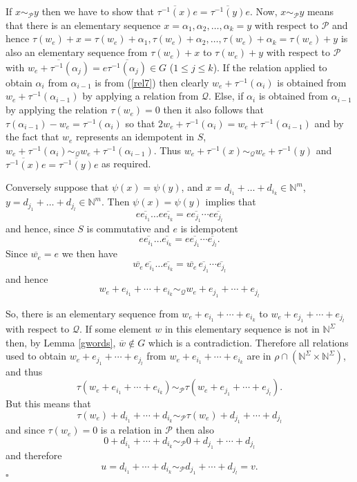 \documentclass{acmconf}
\begin{document}
If $x\sim_{\mathcal{P}}y$ then we have to show that
$\overline{\tau^{-1}(x)}e=\overline{\tau^{-1}(y)}e$.
Now, $x\sim_{\mathcal{P}}y$
means that there is an elementary sequence $x=\alpha_1,\alpha_2,
\ldots,\alpha_k=y$ with respect to $\mathcal{P}$ and hence
$\tau(w_e)+x=\tau(w_e)+\alpha_1,\tau(w_e)+\alpha_2,\ldots,
\tau(w_e)+\alpha_k=\tau(w_e)+y$ is also an elementary sequence from 
$\tau(w_e)+x$ to $\tau(w_e)+y$ with respect to $\mathcal{P}$ with 
$\overline{w_e+\tau^{-1}(\alpha_j)}=e\overline{\tau^{-1}(\alpha_j)}\in G$ 
($1\leq j\leq k$).
If the relation applied to obtain $\alpha_i$ from $\alpha_{i-1}$
is from (\ref{rel7}) then clearly $w_e+\tau^{-1}(\alpha_i)$ is obtained
from $w_e+\tau^{-1}(\alpha_{i-1})$ by applying a relation from $\mathcal{Q}$.
Else, if $\alpha_i$ is obtained from $\alpha_{i-1}$ by applying the
relation $\tau(w_e)=0$ then it also follows that
$\tau(\alpha_{i-1}) - w_e = \tau^{-1}(\alpha_i)$ so that
$2w_e+\tau^{-1}(\alpha_i) = w_e+\tau^{-1}(\alpha_{i-1})$ and by the fact that
$w_e$ represents an idempotent in $S$,
$w_e+\tau^{-1}(\alpha_i)
\sim_{\mathcal{Q}}w_e+\tau^{-1}(\alpha_{i-1})$. 
Thus $w_e+\tau^{-1}(x)\sim_{\mathcal{Q}}w_e+\tau^{-1}(y)$ and
$\overline{\tau^{-1}(x)}e=\overline{\tau^{-1}(y)}e$ as required. 

Conversely suppose that $\psi(x)=\psi(y)$, and 
$x=d_{i_1}+\ldots+d_{i_k}\in\mathbb{N}^m$,
$y=d_{j_1}+\ldots+d_{j_l}\in\mathbb{N}^m$.
Then $\psi(x)=\psi(y)$ implies that
$$e\overline{e_{i_1}}\ldots e\overline{e_{i_k}}=
e\overline{e_{j_1}}\cdots e\overline{e_{j_l}}$$
and hence, since $S$ is commutative and $e$ is idempotent
$$e\overline{e_{i_1}}\ldots\overline{e_{i_k}}=
e\overline{e_{j_1}}\cdots \overline{e_{j_l}}.$$
Since $\overline{w_e}=e$ we then have
$$\overline{w_e}\,\overline{e_{i_1}}\ldots\overline{e_{i_k}}=
\overline{w_e}\,\overline{e_{j_1}}\cdots \overline{e_{j_l}}$$
and hence 
$$w_e+e_{i_1}+\cdots+e_{i_k}\sim_{\mathcal{Q}} w_e+e_{j_1}+\cdots
+e_{j_l}$$

So, there is an elementary sequence from 
$w_e+e_{i_1}+\cdots+e_{i_k}$ to $w_e+e_{j_1}+\cdots +e_{j_l}$
with respect to $\mathcal{Q}$. If some element $w$ in this
elementary sequence is not in $\mathbb{N}^{\Sigma}$
then, by Lemma \ref{gwords}, $\overline{w} \notin G$ which is a 
contradiction. Therefore all relations used to obtain 
$w_e+e_{j_1}+\cdots +e_{j_l}$ from $w_e+e_{i_1}+\cdots+e_{i_k}$
are in $\rho\cap(\mathbb{N}^{\Sigma}\times\mathbb{N}^{\Sigma})$, and thus 
$$\tau(w_e+e_{i_1}+\cdots+e_{i_k})\sim_{\mathcal{P}}
\tau(w_e+e_{j_1}+\cdots +e_{j_l}).$$
But this means that
$$\tau(w_e)+d_{i_1}+\cdots+d_{i_k}\sim_{\mathcal{P}}
\tau(w_e)+d_{j_1}+\cdots +d_{j_l}$$
and since $\tau(w_e)=0$ is a relation in $\mathcal{P}$ then also
$$0+d_{i_1}+\cdots+d_{i_k}\sim_{\mathcal{P}}
0+d_{j_1}+\cdots +d_{j_l}$$
and therefore
$$u=d_{i_1}+\cdots+d_{i_k}\sim_{\mathcal{P}}d_{j_1}+\cdots +d_{j_l}=v.$$
$\square$
\end{document}
